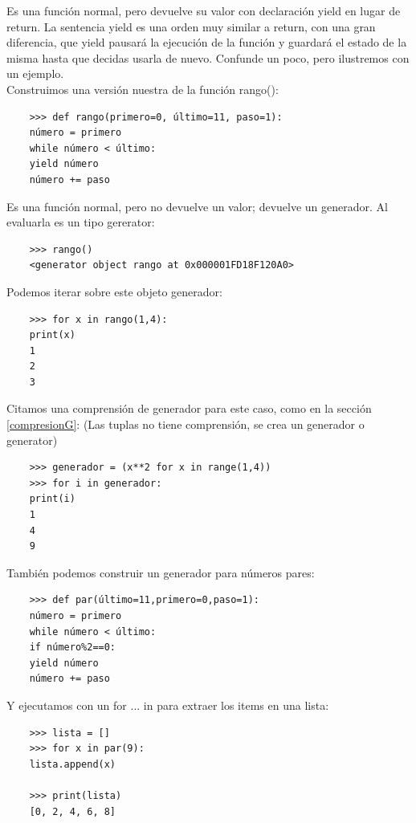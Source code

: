 Es una función normal, pero devuelve su valor con declaración  {\ttfamily yield} en lugar de  {\ttfamily return}. La sentencia  
{\ttfamily yield} es una orden  muy similar a {\ttfamily return}, con una gran diferencia, que {\ttfamily yield} pausará la ejecución de la función y guardará el estado de la misma hasta que decidas usarla de nuevo. Confunde un poco, pero ilustremos con un ejemplo.\\

Construimos una versión nuestra de la función {\ttfamily rango()}:
\begin{lstlisting}
	>>> def rango(primero=0, último=11, paso=1):
	número = primero
	while número < último:
	yield número
	número += paso
\end{lstlisting}

Es una función normal, pero no devuelve un valor; devuelve un generador. Al evaluarla es un tipo gererator:

\begin{lstlisting}
	>>> rango()
	<generator object rango at 0x000001FD18F120A0>
\end{lstlisting}

Podemos iterar sobre este objeto generador:

\begin{lstlisting}
	>>> for x in rango(1,4):
	print(x)
	1
	2
	3
\end{lstlisting}


Citamos una comprensión de generador para este caso, como en la sección \ref{compresionG}:
(Las tuplas no tiene comprensión, se crea un generador o generator)

\begin{lstlisting}
	>>> generador = (x**2 for x in range(1,4))
	>>> for i in generador:
	print(i)
	1
	4
	9
\end{lstlisting}

También podemos construir un generador para números pares:

\begin{lstlisting}
	>>> def par(último=11,primero=0,paso=1):
	número = primero
	while número < último:
	if número%2==0:
	yield número
	número += paso
\end{lstlisting}	
Y ejecutamos con un {\ttfamily for ... in } para extraer los items en una lista:
\begin{lstlisting}	
	>>> lista = []
	>>> for x in par(9):
	lista.append(x)
	
	>>> print(lista)
	[0, 2, 4, 6, 8]	
\end{lstlisting}

